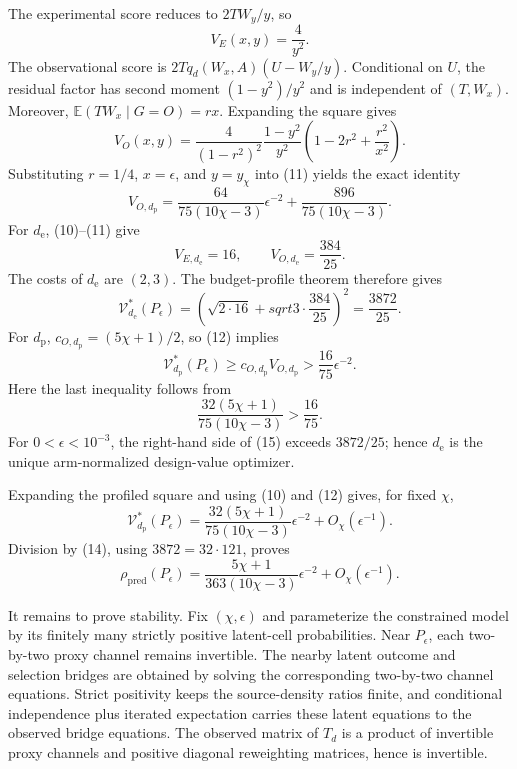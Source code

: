 The experimental score reduces to \(2TW_y/y\), so
\[
 V_E(x,y)=\frac4{y^2}. \tag{10}
\]
The observational score is \(2Tq_d(W_x,A)(U-W_y/y)\). Conditional on \(U\), the residual factor has second moment \((1-y^2)/y^2\) and is independent of \((T,W_x)\). Moreover, \(\mathbb E(TW_x\mid G=O)=rx\). Expanding the square gives
\[
 V_O(x,y)
 =\frac4{(1-r^2)^2}\frac{1-y^2}{y^2}
 \left(1-2r^2+\frac{r^2}{x^2}\right). \tag{11}
\]
Substituting \(r=1/4\), \(x=\epsilon\), and \(y=y_\chi\) into (11) yields the exact identity
\[
 V_{O,d_{\mathrm p}}
 =\frac{64}{75(10\chi-3)}\epsilon^{-2}
 +\frac{896}{75(10\chi-3)}. \tag{12}
\]
For \(d_{\mathrm e}\), (10)--(11) give
\[
 V_{E,d_{\mathrm e}}=16,
 \qquad V_{O,d_{\mathrm e}}=\frac{384}{25}. \tag{13}
\]
The costs of \(d_{\mathrm e}\) are \((2,3)\). The budget-profile theorem therefore gives
\[
 \mathcal V_{d_{\mathrm e}}^*(P_\epsilon)
 =\left(\sqrt{2\cdot16}+sqrt{3\cdot\frac{384}{25}}\right)^2
 =\frac{3872}{25}. \tag{14}
\]
For \(d_{\mathrm p}\), \(c_{O,d_{\mathrm p}}=(5\chi+1)/2\), so (12) implies
\[
 \mathcal V_{d_{\mathrm p}}^*(P_\epsilon)
 \ge c_{O,d_{\mathrm p}}V_{O,d_{\mathrm p}}
 >\frac{16}{75}\epsilon^{-2}. \tag{15}
\]
Here the last inequality follows from
\[
 \frac{32(5\chi+1)}{75(10\chi-3)}>\frac{16}{75}.
\]
For \(0<\epsilon<10^{-3}\), the right-hand side of (15) exceeds \(3872/25\); hence \(d_{\mathrm e}\) is the unique arm-normalized design-value optimizer.

Expanding the profiled square and using (10) and (12) gives, for fixed \(\chi\),
\[
 \mathcal V_{d_{\mathrm p}}^*(P_\epsilon)
 =\frac{32(5\chi+1)}{75(10\chi-3)}\epsilon^{-2}
 +O_\chi(\epsilon^{-1}). \tag{16}
\]
Division by (14), using \(3872=32\cdot121\), proves
\[
 \rho_{\mathrm{pred}}(P_\epsilon)
 =\frac{5\chi+1}{363(10\chi-3)}\epsilon^{-2}
 +O_\chi(\epsilon^{-1}). \tag{17}
\]

It remains to prove stability. Fix \((\chi,\epsilon)\) and parameterize the constrained model by its finitely many strictly positive latent-cell probabilities. Near \(P_\epsilon\), each two-by-two proxy channel remains invertible. The nearby latent outcome and selection bridges are obtained by solving the corresponding two-by-two channel equations. Strict positivity keeps the source-density ratios finite, and conditional independence plus iterated expectation carries these latent equations to the observed bridge equations. The observed matrix of \(T_d\) is a product of invertible proxy channels and positive diagonal reweighting matrices, hence is invertible.

